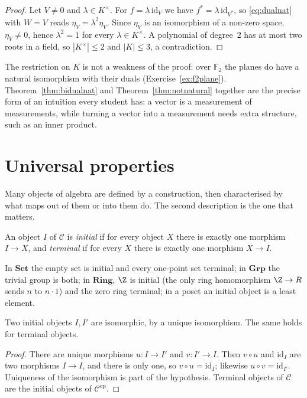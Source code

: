 \begin{proof}
Let $V\ne0$ and $\lambda\in K^\times$. For $f=\lambda\,\mathrm{id}_V$ we have $f^*=\lambda\,\mathrm{id}_{V^*}$, so \eqref{eq:dualnat} with $W=V$ reads $\eta_V=\lambda^2\eta_V$. Since $\eta_V$ is an isomorphism
of a non-zero space, $\eta_V\ne0$, hence $\lambda^2=1$ for every $\lambda\in K^\times$. A polynomial of degree~$2$ has at most two roots in a field, so $|K^\times|\le2$ and $|K|\le3$, a contradiction.
\end{proof}

The restriction on $K$ is not a weakness of the proof: over $\mathbb F_2$ the planes do have a natural isomorphism with their duals (Exercise~\ref{ex:f2plane}). Theorem~\ref{thm:bidualnat} and
Theorem~\ref{thm:notnatural} together are the precise form of an intuition every student has: a vector is a measurement of measurements, while turning a vector into a measurement needs extra
structure, such as an inner product.

\section{Universal properties}

Many objects of algebra are defined by a construction, then characterised by what maps out of them or into them do. The second description is the one that matters.

\begin{definition}\label{def:initial}
An object $I$ of $\mathcal C$ is \emph{initial} if for every object $X$ there is exactly one morphism $I\to X$, and \emph{terminal} if for every $X$ there is exactly one morphism $X\to I$.
\end{definition}

In $\mathbf{Set}$ the empty set is initial and every one-point set terminal; in $\mathbf{Grp}$ the trivial group is both; in $\mathbf{Ring}$, $\Z$ is initial (the only ring homomorphism $\Z\to R$
sends $n$ to $n\cdot1$) and the zero ring terminal; in a poset an initial object is a least element.

\begin{proposition}\label{prop:initialunique}
Two initial objects $I,I'$ are isomorphic, by a unique isomorphism. The same holds for terminal objects.
\end{proposition}

\begin{proof}
There are unique morphisms $u\colon I\to I'$ and $v\colon I'\to I$. Then $v\circ u$ and $\mathrm{id}_I$ are two morphisms $I\to I$, and there is only one, so $v\circ u=\mathrm{id}_I$; likewise $u\circ v=\mathrm{id}_{I'}$.
Uniqueness of the isomorphism is part of the hypothesis. Terminal objects of $\mathcal C$ are the initial objects of $\mathcal C^{\mathrm{op}}$.
\end{proof}

